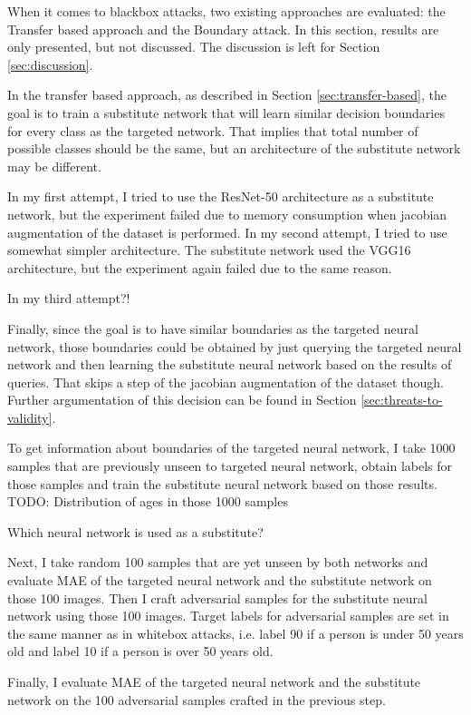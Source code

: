When it comes to blackbox attacks, two existing approaches are evaluated: the Transfer based approach and the Boundary attack. In this section, results are only presented, but not discussed. The discussion is left for Section \ref{sec:discussion}.

In the transfer based approach, as described in Section \ref{sec:transfer-based}, the goal is to train a substitute network that will learn similar decision boundaries for every class as the targeted network. That implies that total number of possible classes should be the same, but an architecture of the substitute network may be different.

In my first attempt, I tried to use the ResNet-50 architecture as a substitute network, but the experiment failed due to memory consumption when jacobian augmentation of the dataset is performed. 
In my second attempt, I tried to use somewhat simpler architecture. The substitute network used the VGG16 architecture, but the experiment again failed due to the same reason.

In my third attempt?!

Finally, since the goal is to have similar boundaries as the targeted neural network, those boundaries could be obtained by just querying the targeted neural network and then learning the substitute neural network based on the results of queries. That skips a step of the jacobian augmentation of the dataset though. Further argumentation of this decision can be found in Section \ref{sec:threats-to-validity}.

To get information about boundaries of the targeted neural network,  I take 1000 samples that are previously unseen to targeted neural network, obtain labels for those samples and train the substitute neural network based on those results. TODO: Distribution of ages in those 1000 samples

Which neural network is used as a substitute?

Next, I take random 100 samples that are yet unseen by both networks and evaluate MAE of the targeted neural network and the substitute network on those 100 images. Then I craft adversarial samples for the substitute neural network using those 100 images. Target labels for adversarial samples are set in the same manner as in whitebox attacks, i.e. label 90 if a person is under 50 years old and label 10 if a person is over 50 years old. 

Finally, I evaluate MAE of the targeted neural network and the substitute network on the 100 adversarial samples crafted in the previous step.

